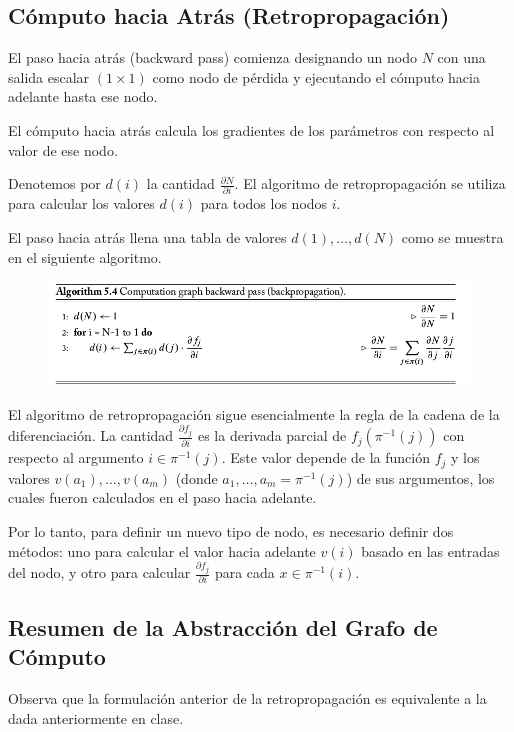 \subsection{Cómputo hacia Atrás (Retropropagación)}
El paso hacia atrás (backward pass) comienza designando un nodo $N$ con una salida escalar $(1 \times 1)$ como nodo de pérdida y ejecutando el cómputo hacia adelante hasta ese nodo.

El cómputo hacia atrás calcula los gradientes de los parámetros con respecto al valor de ese nodo.

Denotemos por $d(i)$ la cantidad $\frac{\partial N}{\partial i}$. El algoritmo de retropropagación se utiliza para calcular los valores $d(i)$ para todos los nodos $i$.

El paso hacia atrás llena una tabla de valores $d(1), \dots, d(N)$ como se muestra en el siguiente algoritmo.

\begin{figure}[htb]
	\centering
	 \includegraphics[scale=0.35]{pics/backwardPass.png}
\end{figure}

El algoritmo de retropropagación sigue esencialmente la regla de la cadena de la diferenciación. La cantidad $\frac{\partial f_j}{\partial i}$ es la derivada parcial de $f_j(\pi^{-1}(j))$ con respecto al argumento $i \in \pi^{-1}(j)$. Este valor depende de la función $f_j$ y los valores $v(a_1), \dots, v(a_m)$ (donde $a_1, \dots, a_m = \pi^{-1}(j)$) de sus argumentos, los cuales fueron calculados en el paso hacia adelante.

Por lo tanto, para definir un nuevo tipo de nodo, es necesario definir dos métodos: uno para calcular el valor hacia adelante $v(i)$ basado en las entradas del nodo, y otro para calcular $\frac{\partial f_j}{\partial i}$ para cada $x \in \pi^{-1}(i)$.

\subsection{Resumen de la Abstracción del Grafo de Cómputo}
Observa que la formulación anterior de la retropropagación es equivalente a la dada anteriormente en clase.

